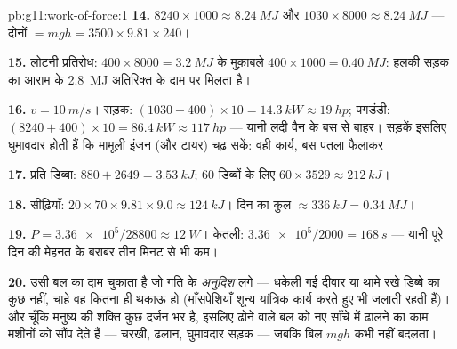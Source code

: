 \begin{solution}{pb:g11:work-of-force:1}
\textbf{14.} $8240 \times 1000 \approx \qty{8.24}{MJ}$ और $1030 \times 8000 \approx \qty{8.24}{MJ}$ --- दोनों $= mgh = 3500
\times 9.81 \times 240$।

\textbf{15.} लोटनी प्रतिरोध: $400 \times 8000 = \qty{3.2}{MJ}$ के मुक़ाबले $400 \times 1000 = \qty{0.40}{MJ}$: हलकी
सड़क का आराम  के \qty{2.8}{MJ} अतिरिक्त के दाम पर मिलता है।

\textbf{16.} $v = \qty{10}{m/s}$। सड़क: $(1030 + 400) \times 10 = \qty{14.3}{kW} \approx \qty{19}{hp}$; पगडंडी: $(8240 + 400) \times 10 = \qty{86.4}{kW} \approx \qty{117}{hp}$ --- यानी लदी वैन के बस
से बाहर। सड़कें इसलिए घुमावदार होती हैं कि मामूली इंजन (और टायर) चढ़ सकें:
वही कार्य, बस पतला फैलाकर।

\textbf{17.} प्रति डिब्बा: $880 + 2649 = \qty{3.53}{kJ}$; $60$ डिब्बों के लिए $60 \times 3529 \approx \qty{212}{kJ}$।

\textbf{18.} सीढ़ियाँ: $20 \times 70 \times 9.81 \times 9.0 \approx
\qty{124}{kJ}$। दिन का कुल $\approx \qty{336}{kJ} = \qty{0.34}{MJ}$।

\textbf{19.} $P = \num{3.36e5}/28800 \approx \qty{12}{W}$। केतली: $\num{3.36e5}/2000 = \qty{168}{s}$ --- यानी पूरे दिन की मेहनत के बराबर
तीन मिनट से भी कम।

\textbf{20.}  उसी बल का दाम चुकाता है जो गति के
\emph{अनुदिश} लगे --- धकेली गई दीवार या थामे रखे डिब्बे का कुछ नहीं, चाहे
वह कितना ही थकाऊ हो (माँसपेशियाँ शून्य यांत्रिक कार्य करते हुए भी
 जलाती रहती हैं)। और चूँकि मनुष्य की शक्ति
कुछ दर्जन  भर है, इसलिए ढोने वाले बल को नए साँचे में
ढालने का काम मशीनों को सौंप देते हैं --- चरखी, ढलान, घुमावदार सड़क ---
जबकि बिल $mgh$ कभी नहीं बदलता।
\end{solution}
